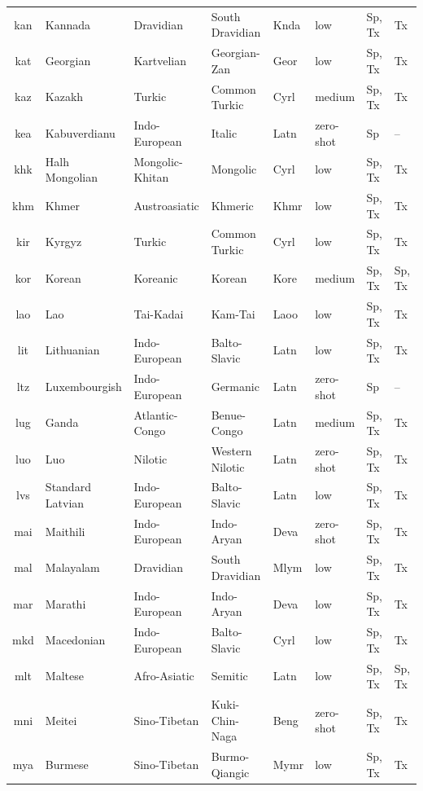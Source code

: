 \begin{table}[!p]
\begin{tabular}{clllllll}
kan & Kannada & Dravidian & South Dravidian & Knda & low & Sp, Tx & Tx \\
kat & Georgian & Kartvelian & Georgian-Zan & Geor & low & Sp, Tx & Tx \\
kaz & Kazakh & Turkic & Common Turkic & Cyrl & medium & Sp, Tx & Tx \\
kea & Kabuverdianu & Indo-European & Italic & Latn & zero-shot & Sp & -- \\
khk & Halh Mongolian & Mongolic-Khitan & Mongolic & Cyrl & low & Sp, Tx & Tx \\
khm & Khmer & Austroasiatic & Khmeric & Khmr & low & Sp, Tx & Tx \\
kir & Kyrgyz & Turkic & Common Turkic & Cyrl & low & Sp, Tx & Tx \\
kor & Korean & Koreanic & Korean & Kore & medium & Sp, Tx & Sp, Tx \\
lao & Lao & Tai-Kadai & Kam-Tai & Laoo & low & Sp, Tx & Tx \\
lit & Lithuanian & Indo-European & Balto-Slavic & Latn & low & Sp, Tx & Tx \\
ltz & Luxembourgish & Indo-European & Germanic & Latn & zero-shot & Sp & -- \\
lug & Ganda & Atlantic-Congo & Benue-Congo & Latn & medium & Sp, Tx & Tx \\
luo & Luo & Nilotic & Western Nilotic & Latn & zero-shot & Sp, Tx & Tx \\
lvs & Standard Latvian & Indo-European & Balto-Slavic & Latn & low & Sp, Tx & Tx \\
mai & Maithili & Indo-European & Indo-Aryan & Deva & zero-shot & Sp, Tx & Tx \\
mal & Malayalam & Dravidian & South Dravidian & Mlym & low & Sp, Tx & Tx \\
mar & Marathi & Indo-European & Indo-Aryan & Deva & low & Sp, Tx & Tx \\
mkd & Macedonian & Indo-European & Balto-Slavic & Cyrl & low & Sp, Tx & Tx \\
mlt & Maltese & Afro-Asiatic & Semitic & Latn & low & Sp, Tx & Sp, Tx \\
mni & Meitei & Sino-Tibetan & Kuki-Chin-Naga & Beng & zero-shot & Sp, Tx & Tx \\
mya & Burmese & Sino-Tibetan & Burmo-Qiangic & Mymr & low & Sp, Tx & Tx \\
\bottomrule
\end{tabular}
\end{table}

